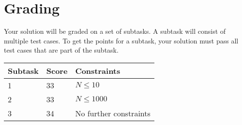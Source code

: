 \section*{Grading}
Your solution will be graded on a set of subtasks.
A subtask will consist of multiple test cases.
To get the points for a subtask, your solution must pass all test cases that are part of the subtask.

\noindent
\begin{tabular}{| l | l | l |}
\hline
Subtask & Score & Constraints \\ \hline
1       & 33    & $N \leq 10$ \\ \hline
2       & 33    & $N \leq 1000$ \\ \hline
3       & 34    & No further constraints \\ \hline
\end{tabular}
